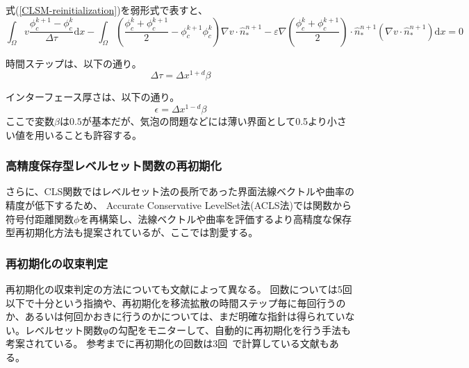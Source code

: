 式(\ref{CLSM-reinitialization})を弱形式で表すと、
\begin{equation}
\label{CLSM-weakform}
	\int_{\Omega} v \frac{\phi_c^{k+1}-\phi_c^k}{\Delta \tau} \mathrm{d} x-\int_{\Omega}\left(\frac{\phi_c^k+\phi_c^{k+1}}{2}-\phi_c^{k+1} \phi_c^k\right) \nabla v \cdot \hat{n}_*^{n+1}-\varepsilon \nabla\left(\frac{\phi_c^k+\phi_c^{k+1}}{2}\right) \cdot \hat{n}_*^{n+1}\left(\nabla v \cdot \hat{n}_*^{n+1}\right) \mathrm{d} x=0
\end{equation}

\begin{comment}
別の文献の式だとこのように書かれているが上と同じと思われる。
\begin{equation}
	\frac{1}{\Delta \tau}\left\langle\left(\phi^{n+1}-\phi^n\right), w\right\rangle-\frac{1}{2}\left\langle\nabla w,\left(\phi^{n+1}+\phi^n\right) \mathbf{n}_{\Gamma}\right\rangle+\left\langle\phi^{n+1} \phi^n \mathbf{n}_{\Gamma}, \nabla w\right\rangle +\frac{\varepsilon}{2}\left\langle\left(\nabla \phi^{n+1}+\nabla \phi^n\right) \cdot \mathbf{n}_{\Gamma}, \nabla w \cdot \mathbf{n}_{\Gamma}\right\rangle=0
\end{equation}
\end{comment}

時間ステップは、以下の通り。
\begin{equation}
	\Delta \tau = \Delta x^{1+d} \beta
\end{equation}

インターフェース厚さは、以下の通り。
\begin{equation}
	\epsilon = \Delta x^{1-d} \beta
\end{equation}
ここで変数$\beta$は$0.5$が基本だが、気泡の問題などには薄い界面として0.5より小さい値を用いることも許容する。

\subsubsection{高精度保存型レベルセット関数の再初期化}
さらに、CLS関数ではレベルセット法の長所であった界面法線ベクトルや曲率の精度が低下するため\cite{Nakazawa2023}、
Accurate Conservative LevelSet法(ACLS法)では関数から符号付距離関数$\phi$を再構築し、法線ベクトルや曲率を評価するより高精度な保存型再初期化方法も提案されているが、ここでは割愛する。

\subsubsection{再初期化の収束判定}
再初期化の収束判定の方法についても文献によって異なる。
回数については5回以下で十分という指摘や、再初期化を移流拡散の時間ステップ毎に毎回行うのか、あるいは何回かおきに行うのかについては、まだ明確な指針は得られていない\cite{Okano2016}。レベルセット関数φの勾配をモニターして、自動的に再初期化を行う手法も考案されている。
参考までに再初期化の回数は3回~\cite{Himeno1999}で計算している文献もある。

